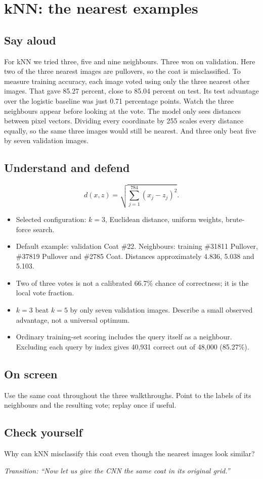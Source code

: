 \documentclass[11pt,a4paper]{article}
\newcommand{\slide}[3]{\clearpage{\small\color{olive}SLIDE #1\hfill Target: #3}\par\section{#2}}
\newcommand{\say}{\subsection{Say aloud}}
\newcommand{\understand}{\subsection{Understand and defend}}
\newcommand{\screen}{\subsection{On screen}}
\newcommand{\selfcheck}[1]{\subsection{Check yourself}#1}
\newcommand{\transition}[1]{\par\smallskip\textit{Transition: #1}}
\begin{document}
\slide{6}{kNN: the nearest examples}{55 seconds}
\say
For kNN we tried three, five and nine neighbours. Three won on validation. Here two of the three nearest images are pullovers, so the coat is misclassified. To measure training accuracy, each image voted using only the three nearest other images. That gave 85.27 percent, close to 85.04 percent on test. Its test advantage over the logistic baseline was just 0.71 percentage points. Watch the three neighbours appear before looking at the vote. The model only sees distances between pixel vectors. Dividing every coordinate by 255 scales every distance equally, so the same three images would still be nearest. And three only beat five by seven validation images.
\understand
\[
 d(x,z)=\sqrt{\sum_{j=1}^{784}(x_j-z_j)^2}.
\]
\begin{itemize}
\item Selected configuration: $k=3$, Euclidean distance, uniform weights, brute-force search.
\item Default example: validation Coat \#22. Neighbours: training \#31811 Pullover, \#37819 Pullover and \#2785 Coat. Distances approximately 4.836, 5.038 and 5.103.
\item Two of three votes is not a calibrated 66.7\% chance of correctness; it is the local vote fraction.
\item $k=3$ beat $k=5$ by only seven validation images. Describe a small observed advantage, not a universal optimum.
\item Ordinary training-set scoring includes the query itself as a neighbour. Excluding each query by index gives 40,931 correct out of 48,000 (85.27\%).
\end{itemize}
\screen
Use the same coat throughout the three walkthroughs. Point to the labels of its neighbours and the resulting vote; replay once if useful.
\selfcheck{Why can kNN misclassify this coat even though the nearest images look similar?}
\transition{``Now let us give the CNN the same coat in its original grid.''}
\end{document}
